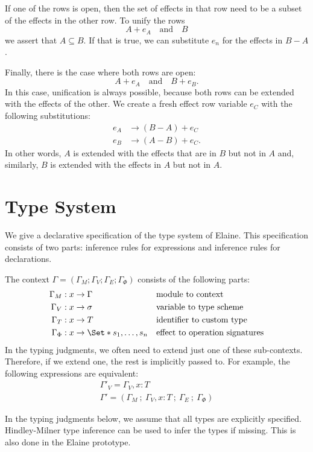 If one of the rows is open, then the set of effects in that row need to be a subset of the effects in the other row. To unify the rows
\[ A + e_A \quad\text{and}\quad B \]
we assert that $A \subseteq B$. If that is true, we can substitute $e_n$ for the effects in $B - A$.

Finally, there is the case where both rows are open:
\[ A + e_A \quad\text{and}\quad B + e_B. \]
In this case, unification is always possible, because both rows can be extended with the effects of the other. We create a fresh effect row variable $e_C$ with the following substitutions:
\begin{align*}
    e_A &\to (B - A) + e_C \\
    e_B &\to (A - B) + e_C.
\end{align*}
In other words, $A$ is extended with the effects that are in $B$ but not in $A$ and, similarly, $B$ is extended with the effects in $A$ but not in $A$.

\section{Type System}

We give a declarative specification of the type system of Elaine. This specification consists of two parts: inference rules for expressions and inference rules for declarations.

The context $\Gamma = (\Gamma_M; \Gamma_V; \Gamma_E; \Gamma_\Phi)$ consists of the following parts:
\begin{align*}
    \Gamma_M &: x \to \Gamma&& \text{module to context}\\
    \Gamma_V &: x \to \sigma && \text{variable to type scheme}\\
    \Gamma_T &: x \to T && \text{identifier to custom type}\\
    \Gamma_\Phi &: x \to \S{s_1,\dots,s_n} && \text{effect to operation signatures}
\end{align*}
In the typing judgments, we often need to extend just one of these sub-contexts. Therefore, if we extend one, the rest is implicitly passed to. For example, the following expressions are equivalent:
\begin{gather*}
    \Gamma'_V = \Gamma_V, x: T \\
    \Gamma' = (\Gamma_M\ ;\ \Gamma_V, x: T\ ;\ \Gamma_E\ ;\ \Gamma_\Phi)
\end{gather*}

In the typing judgments below, we assume that all types are explicitly specified. Hindley-Milner type inference can be used to infer the types if missing. This is also done in the Elaine prototype.

